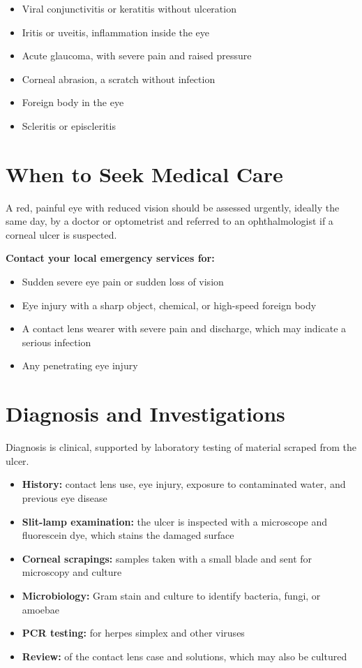 \begin{itemize}
    \item Viral conjunctivitis or keratitis without ulceration
    \item Iritis or uveitis, inflammation inside the eye
    \item Acute glaucoma, with severe pain and raised pressure
    \item Corneal abrasion, a scratch without infection
    \item Foreign body in the eye
    \item Scleritis or episcleritis
\end{itemize}

\section*{When to Seek Medical Care}
A red, painful eye with reduced vision should be assessed urgently, ideally the same day, by a doctor or optometrist and referred to an ophthalmologist if a corneal ulcer is suspected.

\textbf{Contact your local emergency services for:}
\begin{itemize}
    \item Sudden severe eye pain or sudden loss of vision
    \item Eye injury with a sharp object, chemical, or high-speed foreign body
    \item A contact lens wearer with severe pain and discharge, which may indicate a serious infection
    \item Any penetrating eye injury
\end{itemize}

\section*{Diagnosis and Investigations}
Diagnosis is clinical, supported by laboratory testing of material scraped from the ulcer.

\begin{itemize}
    \item \textbf{History:} contact lens use, eye injury, exposure to contaminated water, and previous eye disease
    \item \textbf{Slit-lamp examination:} the ulcer is inspected with a microscope and fluorescein dye, which stains the damaged surface
    \item \textbf{Corneal scrapings:} samples taken with a small blade and sent for microscopy and culture
    \item \textbf{Microbiology:} Gram stain and culture to identify bacteria, fungi, or amoebae
    \item \textbf{PCR testing:} for herpes simplex and other viruses
    \item \textbf{Review:} of the contact lens case and solutions, which may also be cultured
\end{itemize}

